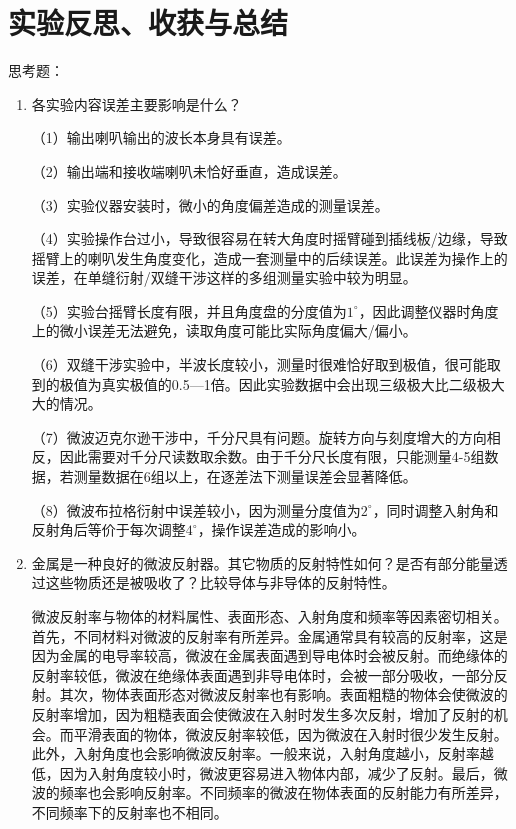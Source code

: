 \documentclass[11pt]{article}
\begin{document}
\section{实验反思、收获与总结}
\noindent 思考题：
\begin{enumerate}
    \item 各实验内容误差主要影响是什么？
    \par  （1）输出喇叭输出的波长本身具有误差。
    \par  （2）输出端和接收端喇叭未恰好垂直，造成误差。
    \par  （3）实验仪器安装时，微小的角度偏差造成的测量误差。
    \par  （4）实验操作台过小，导致很容易在转大角度时摇臂碰到插线板/边缘，导致摇臂上的喇叭发生角度变化，造成一套测量中的后续误差。此误差为操作上的误差，在单缝衍射/双缝干涉这样的多组测量实验中较为明显。
    \par  （5）实验台摇臂长度有限，并且角度盘的分度值为$1^\circ$，因此调整仪器时角度上的微小误差无法避免，读取角度可能比实际角度偏大/偏小。
    \par  （6）双缝干涉实验中，半波长度较小，测量时很难恰好取到极值，很可能取到的极值为真实极值的0.5—1倍。因此实验数据中会出现三级极大比二级极大大的情况。
    \par  （7）微波迈克尔逊干涉中，千分尺具有问题。旋转方向与刻度增大的方向相反，因此需要对千分尺读数取余数。由于千分尺长度有限，只能测量4-5组数据，若测量数据在6组以上，在逐差法下测量误差会显著降低。
    \par  （8）微波布拉格衍射中误差较小，因为测量分度值为$2^\circ$，同时调整入射角和反射角后等价于每次调整$4^\circ$，操作误差造成的影响小。
    \item 金属是一种良好的微波反射器。其它物质的反射特性如何？是否有部分能量透过这些物质还是被吸收了？比较导体与非导体的反射特性。
    \par \hspace*{2em} 微波反射率与物体的材料属性、表面形态、入射角度和频率等因素密切相关。首先，不同材料对微波的反射率有所差异。金属通常具有较高的反射率，这是因为金属的电导率较高，微波在金属表面遇到导电体时会被反射。而绝缘体的反射率较低，微波在绝缘体表面遇到非导电体时，会被一部分吸收，一部分反射。其次，物体表面形态对微波反射率也有影响。表面粗糙的物体会使微波的反射率增加，因为粗糙表面会使微波在入射时发生多次反射，增加了反射的机会。而平滑表面的物体，微波反射率较低，因为微波在入射时很少发生反射。此外，入射角度也会影响微波反射率。一般来说，入射角度越小，反射率越低，因为入射角度较小时，微波更容易进入物体内部，减少了反射。最后，微波的频率也会影响反射率。不同频率的微波在物体表面的反射能力有所差异，不同频率下的反射率也不相同。

\end{enumerate}
\end{document}
